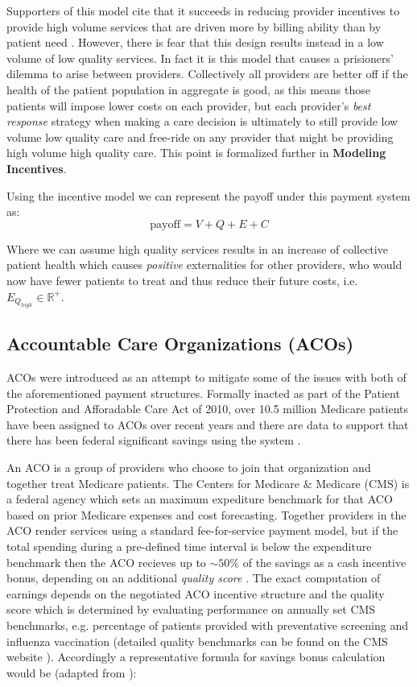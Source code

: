 \documentclass{article}
\begin{document}
Supporters of this model cite that it succeeds in reducing provider incentives to provide high volume services that are driven more by billing ability than by patient need \cite{blended}. However, there is fear that this design results instead in a low volume of low quality services. In fact it is this model that causes a prisioners' dilemma to arise between providers. Collectively all providers are better off if the health of the patient population in aggregate is good, as this means those patients will impose lower costs on each provider, but each provider's \emph{best response} strategy when making a care decision is ultimately to still provide low volume low quality care and free-ride on any provider that might be providing high volume high quality care. This point is formalized further in \textbf{Modeling Incentives}.

Using the incentive model we can represent the payoff under this payment system as:
\begin{equation}
    \text{payoff} = V + Q + E + C
\end{equation}

Where we can assume high quality services results in an increase of collective patient health which causes \emph{positive} externalities for other providers, who would now have fewer patients to treat and thus reduce their future costs, i.e. $E_{Q_{high}} \in \mathbb{R}^+$.

\subsection{Accountable Care Organizations (ACOs)} \label{sec:aco}
ACOs were introduced as an attempt to mitigate some of the issues with both of the aforementioned payment structures. Formally inacted as part of the Patient Protection and Afforadable Care Act of 2010, over 10.5 million Medicare patients have been assigned to ACOs over recent years and there are data to support that there has been federal significant savings using the system \cite{acos}.

An ACO is a group of providers who choose to join that organization and together treat Medicare patients. The Centers for Medicare \& Medicare (CMS) is a federal agency which sets an maximum expediture benchmark for that ACO based on prior Medicare expenses and cost forecasting. Together providers in the ACO render services using a standard fee-for-service payment model, but if the total spending during a pre-defined time interval is below the expenditure benchmark then the ACO recieves up to ${\sim}50$\% of the savings as a cash incentive bonus, depending on an additional \emph{quality score} \cite{acos}. The exact computation of earnings depends on the negotiated ACO incentive structure and the quality score which is determined by evaluating performance on annually set CMS benchmarks, e.g. percentage of patients provided with preventative screening and influenza vaccination (detailed quality benchmarks can be found on the CMS website \cite{cms}). Accordingly a representative formula for savings bonus calculation would be (adapted from \cite{acos}):
\end{document}
